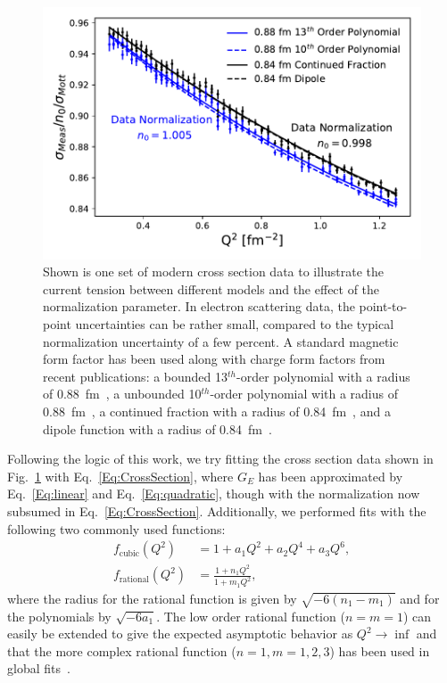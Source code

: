 \documentclass[10pt,aps,prc,twocolumn]{revtex4-1}
\begin{document}
\begin{figure}
\includegraphics[width=\columnwidth]{Figure/RealData.pdf} 
\caption{Shown is one set of modern cross section data to illustrate the current tension between 
different models and the effect of the normalization parameter.   In electron scattering data, the
point-to-point uncertainties can be rather small, compared to the typical normalization uncertainty
of a few percent.   A standard magnetic
form factor has been used along with charge form factors from recent publications:  a bounded
13$^{th}$-order polynomial with a radius of 0.88~fm~\cite{Ye:2017gyb}, a unbounded 10$^{th}$-order polynomial with a radius of 0.88~fm~\cite{Bernauer:2013tpr}, 
a continued fraction with a radius of 0.84~fm~\cite{Griffioen:2015hta}, and a dipole function with a radius of 0.84~fm~\cite{Higinbotham:2015rja}. }
\label{RealData}
\end{figure}

Following the logic of this work, we try fitting the cross section data shown in Fig.~\ref{RealData} with  Eq.~\ref{Eq:CrossSection}, where
$G_E$ has been approximated by Eq.~\ref{Eq:linear} and Eq.~\ref{Eq:quadratic}, though with the normalization now subsumed in Eq.~\ref{Eq:CrossSection}.    
Additionally, we performed fits with the following two commonly used functions:
\begin{align}
f_{\mathrm{cubic}}(Q^2)   & = 1 + a_1 Q^2 + a_2 Q^4 + a_3 Q^6,  \\
f_{\mathrm{rational}}(Q^2) & = \frac{1+n_1 Q^2}{1+m_1 Q^2},
\end{align}
where the radius for the rational function is given by $\sqrt{-6 (n_1 - m_1)}$ and for the polynomials by $\sqrt{-6 a_1}$.
The low order rational function ($n=m=1$) can easily be extended to give the expected asymptotic behavior
as $Q^2 \to \inf$ and that the more complex rational function ($n=1,m=1,2,3$) has been used in global fits~\cite{
Kelly:2004hm,
Puckett:2017flj,   
Gutsche:2017lyu}.
\end{document}
